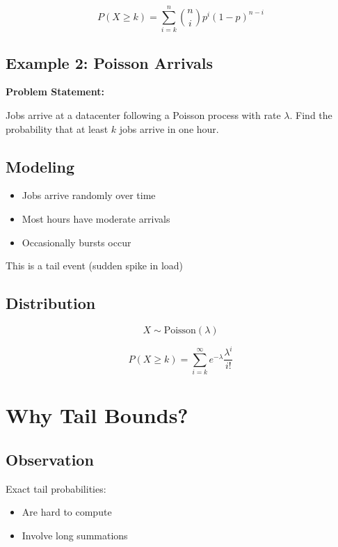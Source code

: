 \documentclass{article}
\begin{document}
\begin{equation}
P(X \geq k) = \sum_{i = k}^{n} \binom{n}{i} p^i (1 - p)^{n - i}
\end{equation}

\subsection{Example 2: Poisson Arrivals}

\textbf{Problem Statement:}

Jobs arrive at a datacenter following a Poisson process with rate $\lambda$.  
Find the probability that at least $k$ jobs arrive in one hour.

\subsection{Modeling}

\begin{itemize}
    \item Jobs arrive randomly over time
    \item Most hours have moderate arrivals
    \item Occasionally bursts occur
\end{itemize}

This is a tail event (sudden spike in load)

\subsection{Distribution}

\begin{equation}
X \sim \text{Poisson}(\lambda)
\end{equation}

\begin{equation}
P(X \geq k) = \sum_{i = k}^{\infty} e^{-\lambda} \frac{\lambda^i}{i!}
\end{equation}

\section{Why Tail Bounds?}

\subsection{Observation}

Exact tail probabilities:
\begin{itemize}
    \item Are hard to compute
    \item Involve long summations
\end{itemize}
\end{document}
